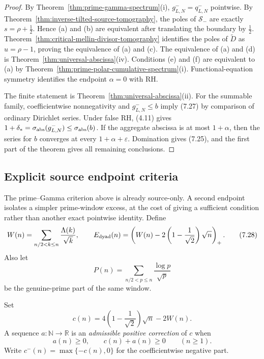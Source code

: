 \documentclass[11pt]{article}
\newcommand{\R}{\mathbb R}
\newcommand{\N}{\mathbb N}
\newcommand{\cS}{\mathcal S}
\begin{document}
\begin{proof}
By Theorem~\ref{thm:prime-gamma-spectrum}\textup{(i)},
$g_{L,N}^-=q_{L,N}^-$ pointwise.  By
Theorem~\ref{thm:inverse-tilted-source-tomography}, the poles of $\cS_-$ are exactly
$s=\rho+\frac12$.  Hence (a) and (b) are equivalent after translating the boundary by
$\frac12$.  Theorem~\ref{thm:critical-mellin-divisor-tomography} identifies the poles of
$\widetilde D$ as $u=\rho-1$, proving the equivalence of (a) and (c).  The equivalence of (a)
and (d) is Theorem~\ref{thm:universal-abscissa}\textup{(iv)}.  Conditions (e) and (f) are
equivalent to (a) by Theorem~\ref{thm:prime-polar-cumulative-spectrum}\textup{(i)}.
Functional-equation symmetry
identifies the endpoint $\alpha=0$ with RH.

The finite statement is Theorem~\ref{thm:universal-abscissa}\textup{(ii)}.  For the summable
family, coefficientwise nonnegativity and $g_{L,N}^-\le b$ imply (7.27) by comparison of
ordinary Dirichlet series.  Under false RH, (4.11) gives
$1+\delta_*=\sigma_{\rm abs}(g_{L,N}^-)\le\sigma_{\rm abs}(b)$.  If the aggregate abscissa is at
most $1+\alpha$, then the series for $b$ converges at every
$1+\alpha+\varepsilon$.  Domination gives (7.25), and the first part of the theorem gives all
remaining conclusions.
\end{proof}

\subsection{Explicit source endpoint criteria}

The prime--Gamma criterion above is already source-only.  A second endpoint isolates a simpler
prime-window excess, at the cost of giving a sufficient condition rather than another exact
pointwise identity.  Define
\[
 W(n)=\sum_{n/2<k\le n}\frac{\Lambda(k)}{\sqrt{k}},
 \qquad
 E_{\rm dyad}(n)=\left(W(n)-2\left(1-\frac1{\sqrt2}\right)\sqrt n\right)_+.
 \tag{7.28}
\]
Also let
\[
 P(n)=\sum_{n/2<p\le n}\frac{\log p}{\sqrt p}
 \tag{7.29}
\]
be the genuine-prime part of the same window.

Set
\[
 c(n)=4\left(1-\frac1{\sqrt2}\right)\sqrt n-2W(n).
 \tag{7.30}
\]
A sequence $a:\N\to\R$ is an \emph{admissible positive correction} of $c$ when
\[
 a(n)\ge0,
 \qquad c(n)+a(n)\ge0
 \qquad(n\ge1).
 \tag{7.31}
\]
Write $c^-(n)=\max\{-c(n),0\}$ for the coefficientwise negative part.
\end{document}
